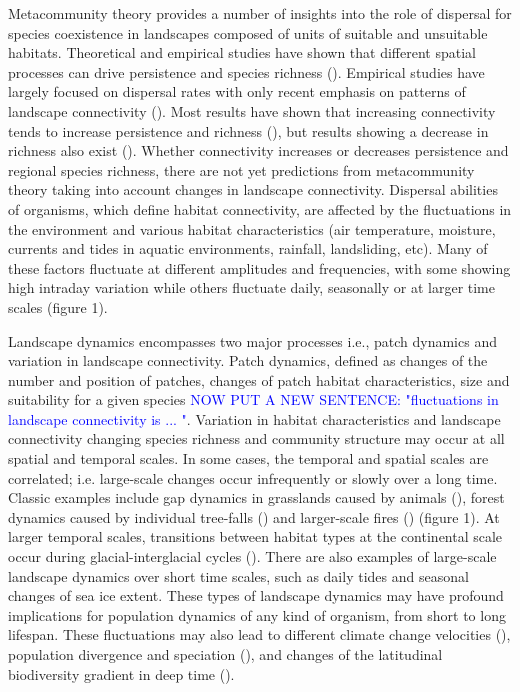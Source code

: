 \documentclass[12pt]{article}
\newcommand{\GM}[1]{\textcolor{Blue}{#1}}
\begin{document}
Metacommunity theory provides a number of insights into the role of dispersal for species coexistence in landscapes composed of units of suitable and unsuitable habitats. Theoretical and empirical studies have shown that different spatial processes can drive persistence and species richness (\cite{Holyoaketal2005}). Empirical studies have largely focused on dispersal rates with only recent emphasis on patterns of landscape connectivity (\cite{kneitel2004, cadotte2006}). Most results have shown that increasing connectivity tends to increase persistence and richness (\cite{ellneretal2001, foxetal2011}), but results showing a decrease in richness also exist (\cite{daviesetal2009, altermattetal2011}). Whether connectivity increases or decreases persistence and regional species richness, there are not yet predictions from metacommunity theory taking into account changes in landscape connectivity. Dispersal abilities of organisms, which define habitat connectivity, are affected by the fluctuations in the environment and various habitat characteristics (air temperature, moisture, currents and tides in aquatic environments, rainfall, landsliding, etc). Many of these factors fluctuate at different amplitudes and frequencies, with some showing high intraday variation while others fluctuate daily, seasonally or at larger time scales (figure 1). 

Landscape dynamics encompasses two major processes i.e., patch dynamics and variation in landscape connectivity. Patch dynamics, defined as changes of the number and position of patches, changes of patch habitat characteristics, size and suitability for a given species \GM{NOW PUT A NEW SENTENCE: "fluctuations in landscape connectivity is ... "}. Variation in habitat characteristics and landscape connectivity changing species richness and community structure may occur at all spatial and temporal scales. In some cases, the temporal and spatial scales are correlated; i.e. large-scale changes occur infrequently or slowly over a long time. Classic examples include gap dynamics in grasslands caused by animals (\cite{WhickerDetling1988, HobbsMooney1991, MiltonEtAl1997}), forest dynamics caused by individual tree-falls (\cite{Goldblum1997}) and larger-scale fires (\cite{VanWagnerEtAl2006, WhelanEtAl2013}) (figure 1). At larger temporal scales, transitions between habitat types at the continental scale occur during glacial-interglacial cycles (\cite{WerneckEtAl2011}). There are also examples of large-scale landscape dynamics over short
time scales, such as daily tides and seasonal changes of sea ice extent. These types of landscape dynamics may have profound implications for population dynamics of any kind of organism, from short to long lifespan. These fluctuations may also lead to different climate change velocities (\cite{loarieetal2009}), population divergence and speciation (\cite{aguileetal2011}), and changes of the latitudinal biodiversity gradient in deep time (\cite{mannionetal2014}).
\end{document}
